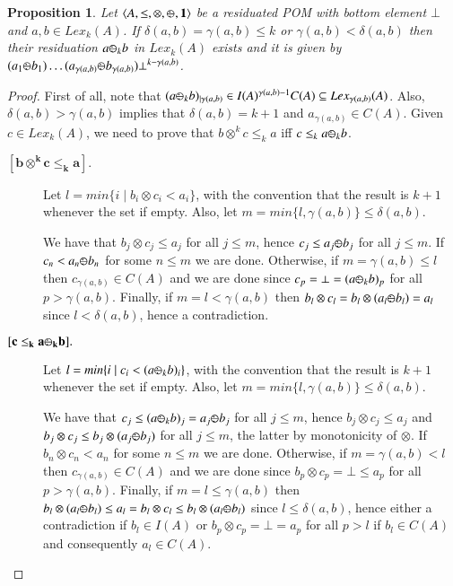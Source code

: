 \documentclass[a4paper]{elsarticle}
\newtheorem{proposition}{Proposition}
\newcommand{\monop}{\otimes}
\newcommand{\1}{\mathbf{1}}
\def\odiv{{ \ominus\hspace{-8pt}:}\;}
\begin{document}
\begin{proposition}
	\label{div2}
	Let $\langle A, \leq, \monop, \odiv, \1 \rangle$
	be a residuated POM with bottom element $\bot$ and $a, b \in Lex_k(A)$.
	If $\delta(a,b) = \gamma(a,b) \leq k$ or $ \gamma(a,b) < \delta(a,b)$
	then their residuation $a \odiv_k b$ 
	in $Lex_k(A)$ exists and it is given by
	$(a_1 \odiv b_1) \ldots  (a_{\gamma(a, b)}  \odiv b_{\gamma(a, b)}) 
	\bot^{k - \gamma(a, b)}$.
\end{proposition}

\begin{proof}
	First of all, note that 
	$(a \odiv_k b)_{\mid \gamma(a,b)} \in I(A)^{\gamma(a,b)-1} C(A) \subseteq Lex_{\gamma(a,b)}(A)$.
	Also, $\delta(a,b) >  \gamma(a,b)$ implies that 
	$\delta(a,b) = k+1$ and $a_{\gamma(a,b)} \in C(A)$.
	Given $c \in Lex_k(A)$, we need to prove that
	$b\otimes^k c \leq_k a$ iff $c \leq_k a \odiv_k b$.
	
	\begin{description}
		\item[$\mathbf{[b\otimes^k c \leq_k a].}$]
		Let $l = min \{ i \mid b_i \otimes c_i < a_i\}$,
		with the convention that the result is $k+1$ whenever the set if empty.
		Also, let $m = min \{l, \gamma(a,b)\} \leq \delta(a,b)$.
		
		We have that $b_j \otimes c_j \leq a_j$ for all $j \leq m$, hence
		$c_j \leq a_j \odiv b_j $ for all $j \leq m$. 
		If $c_n < a_n \odiv b_n$ for some $n \leq m$
		we are done. 
		Otherwise, if $m = \gamma(a,b) \leq l$ then 
		$c_{\gamma(a,b)} \in C(A)$ and we are done since
		$c_p = \bot = (a \odiv_k b)_p$ for all $p > {\gamma(a,b)}$.
		Finally, if $m = l < \gamma(a,b)$ then 
		$b_l \otimes c_l = b_l \otimes (a_l \odiv b_l) = a_l$
		since $l < \delta(a,b)$, hence a contradiction.
		
		\item[$\mathbf{[c \leq_k a \odiv_k b].}$]
		Let $l = min \{ i \mid c_i < (a \odiv_k b)_i\}$,
		with the convention that the result is $k+1$ whenever the set if empty.
		Also, let $m = min \{l, \gamma(a,b)\} \leq \delta(a,b)$.
		
		We have that $c_j \leq (a \odiv_k b)_j = a_j \odiv b_j$ for all $j \leq m$, hence
		$b_j \otimes c_j \leq a_j$ and $b_j \otimes c_j \leq b_j \otimes (a_j \odiv b_j)$ 
		for all $j \leq m$, the latter by monotonicity of $\otimes$.
		If $b_n \otimes c_n < a_n$ for some $n \leq m$
		we are done. 
		Otherwise, if $m = \gamma(a,b) < l$ then 
		$c_{\gamma(a,b)} \in C(A)$ and we are done since
		$b_p \otimes c_p = \bot \leq a_p$ for all $p > {\gamma(a,b)}$.
		Finally, if $m = l \leq \gamma(a,b)$ then 
		$b_l \otimes (a_l \odiv b_l) \leq a_l  = b_l \otimes c_l \leq b_l \otimes (a_l \odiv b_l)$
		since $l \leq \delta(a,b)$, hence either a contradiction
		if $b_l \in I(A)$ or $b_p \otimes c_p = \bot = a_p$ for all $p > l$
		if $b_l \in C(A)$ and consequently $a_l \in C(A)$.
	\end{description}
\end{proof}
\end{document}
